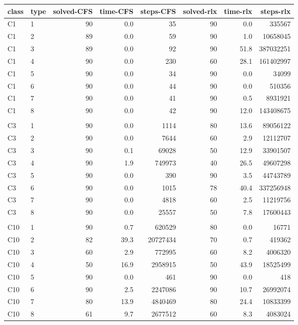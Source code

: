 \begin{tabular}{llrrrrrr}
\toprule
class & type & solved-CFS & time-CFS & steps-CFS & solved-rlx & time-rlx & steps-rlx \\
\midrule
C1 & 1 & 90 & 0.0 & 35 & 90 & 0.0 & 335567 \\
C1 & 2 & 89 & 0.0 & 59 & 90 & 1.0 & 10658045 \\
C1 & 3 & 89 & 0.0 & 92 & 90 & 51.8 & 387032251 \\
C1 & 4 & 90 & 0.0 & 230 & 60 & 28.1 & 161402997 \\
C1 & 5 & 90 & 0.0 & 34 & 90 & 0.0 & 34099 \\
C1 & 6 & 90 & 0.0 & 44 & 90 & 0.0 & 510356 \\
C1 & 7 & 90 & 0.0 & 41 & 90 & 0.5 & 8931921 \\
C1 & 8 & 90 & 0.0 & 42 & 90 & 12.0 & 143408675 \\
\\
C3 & 1 & 90 & 0.0 & 1114 & 80 & 13.6 & 89056122 \\
C3 & 2 & 90 & 0.0 & 7644 & 60 & 2.9 & 12112707 \\
C3 & 3 & 90 & 0.1 & 69028 & 50 & 12.9 & 33901507 \\
C3 & 4 & 90 & 1.9 & 749973 & 40 & 26.5 & 49607298 \\
C3 & 5 & 90 & 0.0 & 390 & 90 & 3.5 & 44743789 \\
C3 & 6 & 90 & 0.0 & 1015 & 78 & 40.4 & 337256948 \\
C3 & 7 & 90 & 0.0 & 4818 & 60 & 2.5 & 11219756 \\
C3 & 8 & 90 & 0.0 & 25557 & 50 & 7.8 & 17600443 \\
\\
C10 & 1 & 90 & 0.7 & 620529 & 80 & 0.0 & 16771 \\
C10 & 2 & 82 & 39.3 & 20727434 & 70 & 0.7 & 419362 \\
C10 & 3 & 60 & 2.9 & 772995 & 60 & 8.2 & 4006320 \\
C10 & 4 & 50 & 16.9 & 2958915 & 50 & 43.9 & 18525499 \\
C10 & 5 & 90 & 0.0 & 461 & 90 & 0.0 & 418 \\
C10 & 6 & 90 & 2.5 & 2247086 & 90 & 10.7 & 26992074 \\
C10 & 7 & 80 & 13.9 & 4840469 & 80 & 24.4 & 10833399 \\
C10 & 8 & 61 & 9.7 & 2677512 & 60 & 8.3 & 4083024 \\
\bottomrule
\end{tabular}
